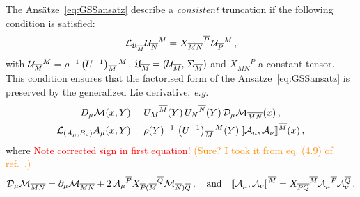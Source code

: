 \documentclass[a4paper, 11pt]{article}
\numberwithin{equation}{section}
\newcommand{\ff}[1]{\mathfrak{#1}}
\newcommand{\ov}[1]{\overline{#1}}
\newcommand{\+}{\oplus}
\newcommand{\gL}{\mathcal{L}}
\newcommand{\cU}{{\cal U}}
\newcommand{\UI}{\left(U^{-1}\right)}
\newcommand{\fl}[1]{\ov{#1}}
\newcommand{\M}{\ensuremath{\mathcal{M}}\xspace}
\newcommand{\A}{\ensuremath{\mathcal{A}}\xspace}
\newcommand{\EM}[1]{\textcolor{red}{#1}}
\newcommand{\CE}[1]{\textcolor{darkorange}{#1}}
\begin{document}
The Ansätze~\eqref{eq:GSSansatz} describe a \textit{consistent} truncation if the following condition is satisfied:
\begin{equation} \label{eq:GenLeibniz}
	\gL_{\ff{U}_{\fl{M}}} {\cU}_{\fl{N}}{}^M = X_{\fl{M}\fl{N}}{}^{\fl{P}}\, \cU_{\fl{P}}{}^M\,,
\end{equation}
with $\cU_{\fl{M}}{}^M = \rho^{-1} \UI_{\fl{M}}{}^M$, $\ff{U}_{\fl{M}} = (\cU_{\fl{M}},\,\Sigma_{\fl{M}})$ and $X_{\fl{M}\fl{N}}{}^{\fl{P}}$ a constant tensor. This condition ensures that the factorised form of the Ansätze~\eqref{eq:GSSansatz} is preserved by the generalized Lie derivative, \textit{e.g.}
\begin{equation} \label{eq:GSSexample}
	\begin{split}
		D_{\mu}\M(x,Y) &= U_{M}{}^{\fl{M}}(Y)\,U_{N}{}^{\fl{N}}(Y)\,{\cal D}_{\mu}\M_{\fl{MN}}(x)\,,\\
		{\cal L}_{(A_{\mu},B_{\nu})}A_{\mu}(x,Y) &= \rho(Y)^{-1}\,\UI_{\fl{M}}{}^{M}(Y)\,\llbracket\A_{\mu},\A_{\nu}\rrbracket^{\fl{M}}(x)\,,
	\end{split}
\end{equation}
where \EM{Note corrected sign in first equation!} \CE{(Sure? I took it from eq. (4.9) of ref.~\cite{Galli:2022idq}.)}
\begin{equation} \label{eq:3dCovDeriv}
	{\cal D}_{\mu}\M_{\fl{MN}} = \partial_{\mu}\M_{\fl{MN}} + 2\,\A_{\mu}{}^{\fl{P}}X_{\fl{P}(\fl{M}}{}^{\fl{Q}}\M_{\fl{N})\fl{Q}}\,, \quad {\rm and} \quad \llbracket\A_{\mu},\A_{\nu}\rrbracket^{\fl{M}}=X_{\fl{PQ}}{}^{\fl{M}}\A_{\mu}{}^{\fl{P}}\A_{\nu}^{\fl{Q}} \,.
\end{equation}
\end{document}
